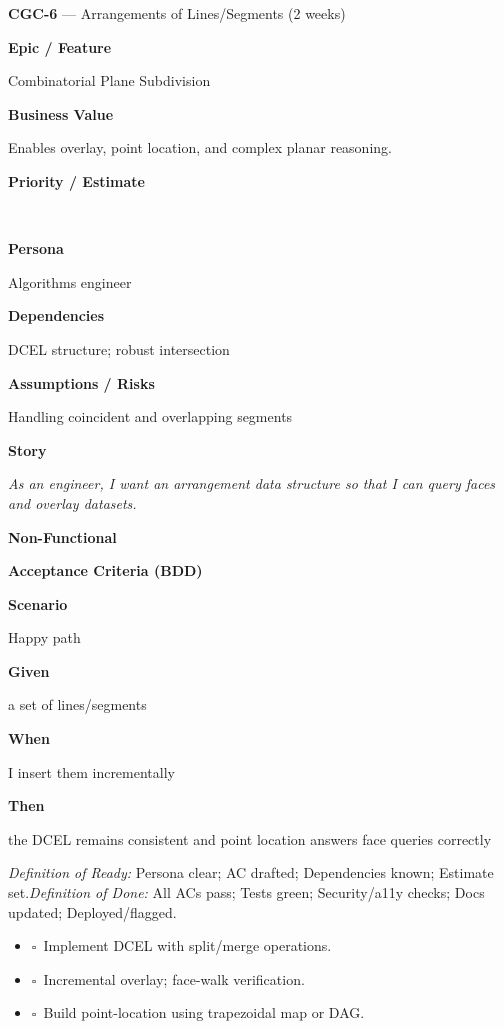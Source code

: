 \documentclass[11pt,a4paper]{article}
\newcommand{\MetaRow}[2]{%
  \noindent\begin{minipage}[t]{0.24\linewidth}\raggedleft\bfseries #1\end{minipage}%
  \hspace{0.8em}%
  \begin{minipage}[t]{0.72\linewidth}\raggedright #2\end{minipage}\par\vspace{0.3em}}
\newcommand{\CBox}{\(\square\)}
\newcommand{\BDDRow}[2]{\MetaRow{#1}{#2}}
\newenvironment{BDD}{\par\medskip}{\par\medskip}
\newcommand{\StoryTitle}[2]{\textbf{#1} --- #2}
\newcommand{\DoR}{\textit{Definition of Ready:} Persona clear; AC drafted; Dependencies known; Estimate set.}
\newcommand{\DoD}{\textit{Definition of Done:} All ACs pass; Tests green; Security/a11y checks; Docs updated; Deployed/flagged.}
\begin{document}
\begin{StoryCard}{\StoryTitle{CGC-6}{Arrangements of Lines/Segments (2 weeks)}}
\MetaRow{Epic / Feature}{Combinatorial Plane Subdivision}
\MetaRow{Business Value}{Enables overlay, point location, and complex planar reasoning.}
\MetaRow{Priority / Estimate}{\ \ \Badge{SP: 8}}
\MetaRow{Persona}{Algorithms engineer}
\MetaRow{Dependencies}{DCEL structure; robust intersection}
\MetaRow{Assumptions / Risks}{Handling coincident and overlapping segments}
\MetaRow{Story}{\emph{As an engineer, I want an arrangement data structure so that I can query faces and overlay datasets.}}

\medskip
\noindent\textbf{Non-Functional}\quad
{}\ \ 

\medskip
\noindent\textbf{Acceptance Criteria (BDD)}
\begin{BDD}
\BDDRow{Scenario}{Happy path}
\BDDRow{Given}{a set of lines/segments}
\BDDRow{When}{I insert them incrementally}
\BDDRow{Then}{the DCEL remains consistent and point location answers face queries correctly}
\end{BDD}

\medskip
{\footnotesize \DoR\quad\textbullet\quad \DoD}
\end{StoryCard}

\begin{TaskBox}
\begin{itemize}
  \item \CBox\ Implement DCEL with split/merge operations.
  \item \CBox\ Incremental overlay; face-walk verification.
  \item \CBox\ Build point-location using trapezoidal map or DAG.
\end{itemize}
\end{TaskBox}

\clearpage
\end{document}

